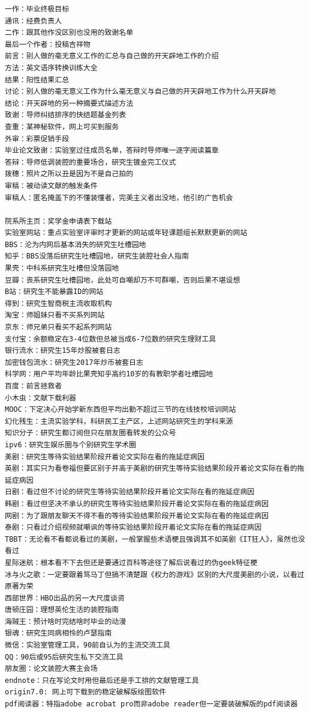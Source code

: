 \documentclass[
]{book}
\begin{document}
\begin{verbatim}
一作：毕业终极目标
通讯：经费负责人
二作：跟其他作没区别也没用的致谢名单
最后一个作者：投稿吉祥物
前言：别人做的毫无意义工作的汇总与自己做的开天辟地工作的介绍
方法：英文语序转换训练大全
结果：阳性结果汇总
讨论：别人做的毫无意义工作为什么毫无意义与自己做的开天辟地工作为什么开天辟地
结论：开天辟地的另一种摘要式描述方法
致谢：导师纠结排序的快结题基金列表
查重：某神秘软件，网上可买到服务
外审：彩票促销手段
毕业论文致谢：实验室过往成员名单，答辩时导师唯一逐字阅读篇章
答辩：导师低调装腔的重要场合，研究生镀金完工仪式
拨穗：照片之所以丑是因为不是自己拍的
审稿：被动读文献的触发条件
审稿人：匿名掩盖下的不懂装懂者，完美主义者出没地，他引的广告机会

院系所主页：奖学金申请表下载站
实验室网站：重点实验室评审时才更新的网站或年轻课题组长默默更新的网站
BBS：沦为内网后基本消失的研究生吐槽园地
知乎：BBS没落后研究生吐槽园地，研究生装腔社会人指南
果壳：中科系研究生吐槽但没落园地
豆瓣：丧系研究生吐槽园地，此处可自嘲却万不可群嘲，否则后果不堪设想
B站：研究生不能暴露ID的网站
得到：研究生智商税主流收取机构
淘宝：师姐妹只看不买系列网站
京东：师兄弟只看买不起系列网站
支付宝：余额稳定在3-4位数但总被当成6-7位数的研究生理财工具
银行流水：研究生15年炒股被套日志
加密钱包流水：研究生2017年炒币被套日志
科学网：用户平均年龄比果壳知乎高约10岁的有教职学者吐槽园地
百度：前言拯救者
小木虫：文献下载利器
MOOC：下定决心开始学新东西但平均出勤不超过三节的在线技校培训网站
幻化残生：主流实验学科，科研民工主产区，上述网站研究生的学科来源
知识分子：研究生都订阅但只在朋友圈看转发的公众号
ipv6：研究生娱乐圈与个别研究生学术圈
美剧：研究生等待实验结果阶段开着论文实际在看的拖延症病因
英剧：其实只为看卷福但要区别于并高于美剧的研究生等待实验结果阶段开着论文实际在看的拖延症病因
日剧：看过但不讨论的研究生等待实验结果阶段开着论文实际在看的拖延症病因
韩剧：看过但坚决不承认的研究生等待实验结果阶段开着论文实际在看的拖延症病因
网剧：为了跟朋友聊天不得不看的等待实验结果阶段开着论文实际在看的拖延症病因
泰剧：只看过介绍视频就嘲讽的等待实验结果阶段开着论文实际在看的拖延症病因
TBBT：无论看不看都说看过的美剧，一般掌握些术语梗且强调其不如英剧《IT狂人》，虽然也没看过
星际迷航：根本看不下去但还是要通过百科等途径了解后说看过的伪geek特征梗
冰与火之歌：一定要跟着骂马丁但搞不清楚跟《权力的游戏》区别的大尺度美剧的小说，以看过原著为荣
西部世界：HBO出品的另一大尺度谈资
唐顿庄园：理想英伦生活的装腔指南
海贼王：预计啥时完结啥时毕业的动漫
银魂：研究生同病相怜的卢瑟指南
微信：实验室管理工具，90前自认为的主流交流工具
QQ：90后或95后研究生私下交流工具
朋友圈：论文装腔大赛主会场
endnote：只在写论文时用但最后还是手工排的文献管理工具
origin7.0: 网上可下载到的稳定破解版绘图软件
pdf阅读器：特指adobe acrobat pro而非adobe reader但一定要装破解版的pdf阅读器

\end{verbatim}
\end{document}
